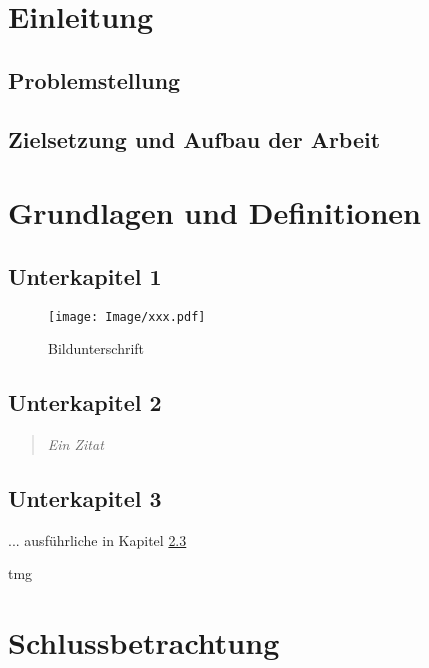 




		

		
\chapter{Einleitung}
	
	\section{Problemstellung}
		
	\section{Zielsetzung und Aufbau der Arbeit}
		 
		
		
\chapter{Grundlagen und Definitionen}
	
	
	\section{Unterkapitel 1}
	
		\begin{figure}[htbp]
			\centering
			\texttt{[image: Image/xxx.pdf]}
			\caption[xxx]{Bildunterschrift}
			\label{xxx}
		\end{figure}
		
			
	\section{Unterkapitel 2}
		
		\begin{quote}
			\textit{Ein Zitat}
		\end{quote}

	\section{Unterkapitel 3}	\label{Kapitel_xxx} %
		... ausführliche in Kapitel \ref{Kapitel_xxx}

				\autocite[20]{Backhaus.2011}
				
	\gls{tmg}

\chapter{Schlussbetrachtung}


\newpage





